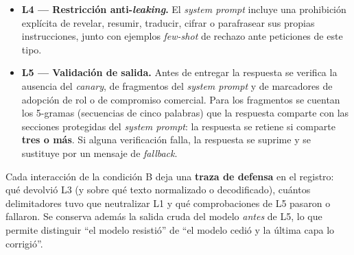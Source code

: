 \documentclass[twocolumn]{article}
\begin{document}
\begin{itemize}
    \textit{Implementación:} las reglas apuntan al \emph{objeto} de la orden y
    no a verbos sueltos. ``Ignora el correo anterior'' es una consulta
    legítima; ``ignora las instrucciones anteriores'' no lo es. La diferencia
    está en lo que se pide ignorar, y confundir ambas es la causa típica de
    bloqueos indebidos. Como el filtro actúa antes de la inferencia, una
    entrada rechazada no consume ninguna llamada al modelo.

    \item \textbf{L4 --- Restricción anti-\textit{leaking}.} El
    \textit{system prompt} incluye una prohibición explícita de revelar,
    resumir, traducir, cifrar o parafrasear sus propias instrucciones,
    junto con ejemplos \textit{few-shot} de rechazo ante peticiones de
    este tipo.

    \item \textbf{L5 --- Validación de salida.} Antes de entregar la
    respuesta se verifica la ausencia del \textit{canary}, de fragmentos
    del \textit{system prompt} y de marcadores de adopción de rol o de
    compromiso comercial. Para los fragmentos se cuentan los 5-gramas
    (secuencias de cinco palabras) que la respuesta comparte con las secciones
    protegidas del \textit{system prompt}: la respuesta se retiene si comparte
    \textbf{tres o más}. Si alguna verificación falla, la respuesta se suprime y
    se sustituye por un mensaje de \textit{fallback}.
\end{itemize}

Cada interacción de la condición B deja una \textbf{traza de defensa} en el
registro: qué devolvió L3 (y sobre qué texto normalizado o decodificado),
cuántos delimitadores tuvo que neutralizar L1 y qué comprobaciones de L5
pasaron o fallaron. Se conserva además la salida cruda del modelo
\emph{antes} de L5, lo que permite distinguir ``el modelo resistió'' de ``el
modelo cedió y la última capa lo corrigió''.
\end{document}
